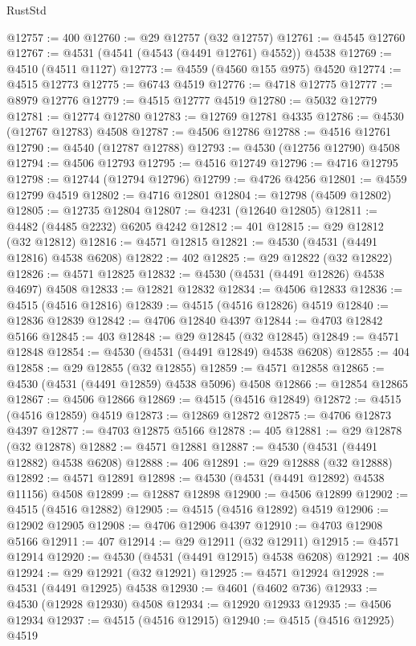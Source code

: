 \begin{lexlean}{RustStd}
\begin{coremodule}
{\begin{coremodule}
{{{{{{{{{{{{{{{{{{{{{{{{{{{{{{{{{{{{{{{{{{{{{{{{{{{{{{{@12757 := 400
@12760 := @29 @12757 (@32 @12757)
@12761 := @4545 @12760
@12767 := @4531 (@4541 (@4543 (@4491 @12761) @4552)) @4538
@12769 := @4510 (@4511 @1127)
@12773 := @4559 (@4560 @155 @975) @4520
@12774 := @4515 @12773
@12775 := @6743 @4519
@12776 := @4718 @12775
@12777 := @8979 @12776
@12779 := @4515 @12777 @4519
@12780 := @5032 @12779
@12781 := @12774 @12780
@12783 := @12769 @12781 @4335
@12786 := @4530 (@12767 @12783) @4508
@12787 := @4506 @12786
@12788 := @4516 @12761
@12790 := @4540 (@12787 @12788)
@12793 := @4530 (@12756 @12790) @4508
@12794 := @4506 @12793
@12795 := @4516 @12749
@12796 := @4716 @12795
@12798 := @12744 (@12794 @12796)
@12799 := @4726 @4256
@12801 := @4559 @12799 @4519
@12802 := @4716 @12801
@12804 := @12798 (@4509 @12802)
@12805 := @12735 @12804
@12807 := @4231 (@12640 @12805)
@12811 := @4482 (@4485 @2232) @6205 @4242
@12812 := 401
@12815 := @29 @12812 (@32 @12812)
@12816 := @4571 @12815
@12821 := @4530 (@4531 (@4491 @12816) @4538 @6208)
@12822 := 402
@12825 := @29 @12822 (@32 @12822)
@12826 := @4571 @12825
@12832 := @4530 (@4531 (@4491 @12826) @4538 @4697) @4508
@12833 := @12821 @12832
@12834 := @4506 @12833
@12836 := @4515 (@4516 @12816)
@12839 := @4515 (@4516 @12826) @4519
@12840 := @12836 @12839
@12842 := @4706 @12840 @4397
@12844 := @4703 @12842 @5166
@12845 := 403
@12848 := @29 @12845 (@32 @12845)
@12849 := @4571 @12848
@12854 := @4530 (@4531 (@4491 @12849) @4538 @6208)
@12855 := 404
@12858 := @29 @12855 (@32 @12855)
@12859 := @4571 @12858
@12865 := @4530 (@4531 (@4491 @12859) @4538 @5096) @4508
@12866 := @12854 @12865
@12867 := @4506 @12866
@12869 := @4515 (@4516 @12849)
@12872 := @4515 (@4516 @12859) @4519
@12873 := @12869 @12872
@12875 := @4706 @12873 @4397
@12877 := @4703 @12875 @5166
@12878 := 405
@12881 := @29 @12878 (@32 @12878)
@12882 := @4571 @12881
@12887 := @4530 (@4531 (@4491 @12882) @4538 @6208)
@12888 := 406
@12891 := @29 @12888 (@32 @12888)
@12892 := @4571 @12891
@12898 := @4530 (@4531 (@4491 @12892) @4538 @11156) @4508
@12899 := @12887 @12898
@12900 := @4506 @12899
@12902 := @4515 (@4516 @12882)
@12905 := @4515 (@4516 @12892) @4519
@12906 := @12902 @12905
@12908 := @4706 @12906 @4397
@12910 := @4703 @12908 @5166
@12911 := 407
@12914 := @29 @12911 (@32 @12911)
@12915 := @4571 @12914
@12920 := @4530 (@4531 (@4491 @12915) @4538 @6208)
@12921 := 408
@12924 := @29 @12921 (@32 @12921)
@12925 := @4571 @12924
@12928 := @4531 (@4491 @12925) @4538
@12930 := @4601 (@4602 @736)
@12933 := @4530 (@12928 @12930) @4508
@12934 := @12920 @12933
@12935 := @4506 @12934
@12937 := @4515 (@4516 @12915)
@12940 := @4515 (@4516 @12925) @4519
}}}}}}}}}}}}}}}}}}}}}}}}}}}}}}}}}}}}}}}}}}}}}}}}}}}}}}}
\end{coremodule}}
\end{coremodule}
\end{lexlean}

